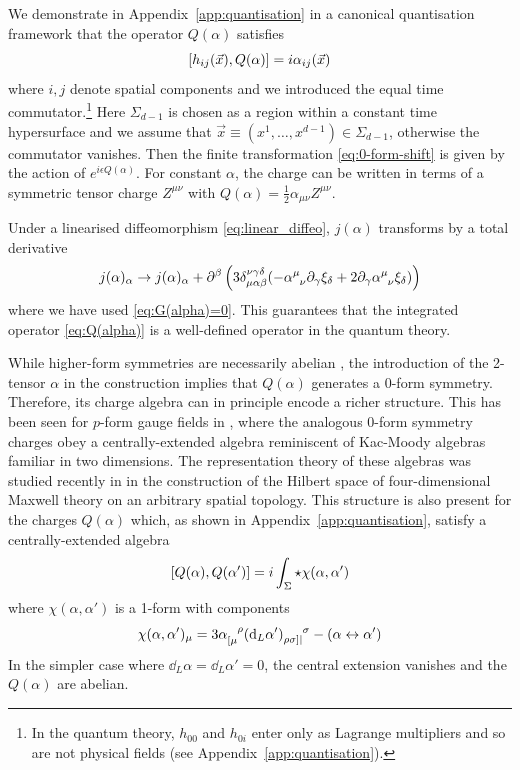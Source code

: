We demonstrate in Appendix~\ref{app:quantisation} in a canonical quantisation framework that the operator $Q(\alpha)$ satisfies
\begin{equation}
    \comm{h_{ij}(\vec{x})}{Q(\alpha)} = i\alpha_{ij}(\vec{x})
\end{equation}
where $i,j$ denote spatial components and we introduced the equal time commutator.\footnote{In the quantum theory, $h_{00}$ and $h_{0i}$ enter only as Lagrange multipliers and so are not physical fields (see Appendix~\ref{app:quantisation}).}
Here $\Sigma_{d-1}$ is chosen as a region within a constant time hypersurface and we assume that $\vec{x} \equiv (x^1,\dots,x^{d-1}) \in \Sigma_{d-1}$, otherwise the commutator vanishes. Then the finite transformation \eqref{eq:0-form-shift} is given by the action of $e^{i\epsilon Q(\alpha)}$. For constant $\alpha$, the charge can be written in terms of a symmetric tensor charge $Z^{\mu\nu}$ with $Q(\alpha)=\frac{1}{2} \alpha_{\mu\nu}Z^{\mu\nu}$.

Under a linearised diffeomorphism \eqref{eq:linear_diffeo}, $j(\alpha)$ transforms by a total derivative
\begin{equation}
    j(\alpha)_\alpha \to j(\alpha)_\alpha + \partial^\beta \left( 3 \delta^{\nu\gamma\delta}_{\mu\alpha\beta} ( -\alpha\indices{^\mu_\nu} \partial_\gamma \xi_\delta + 2 \partial_\gamma \alpha\indices{^\mu_\nu} \xi_\delta) \right)
\end{equation}
where we have used \eqref{eq:G(alpha)=0}.
This guarantees that the integrated operator \eqref{eq:Q(alpha)} is a well-defined operator in the quantum theory.

While higher-form symmetries are necessarily abelian \cite{Gaiotto2015GeneralizedSymmetries}, the introduction of the 2-tensor $\alpha$ in the construction implies that $Q(\alpha)$ generates a 0-form symmetry. Therefore, its charge algebra can in principle encode a richer structure. This has been seen for $p$-form gauge fields in \cite{Hofman:2018lfz}, where the analogous 0-form symmetry charges obey a centrally-extended algebra reminiscent of Kac-Moody algebras familiar in two dimensions. The representation theory of these algebras was studied recently in \cite{Hofman:2024oze} in the construction of the Hilbert space of four-dimensional Maxwell theory on an arbitrary spatial topology. 
This structure is also present for the charges $Q(\alpha)$ which, as shown in Appendix~\ref{app:quantisation}, satisfy a centrally-extended algebra
\begin{equation}\label{eq:central_ext}
    \comm{Q(\alpha)}{Q(\alpha')} = i\int_\Sigma \star \chi(\alpha,\alpha')
\end{equation}
where $\chi(\alpha,\alpha')$ is a 1-form with components
\begin{equation}\label{eq:zeta_def}
    \chi(\alpha,\alpha')_\mu = 3\alpha\indices{_{[\mu}^\rho} (\dd_L\alpha')\indices{_{\rho\sigma]|}^\sigma} - (\alpha\leftrightarrow\alpha')
\end{equation}
In the simpler case where $\dd_L \alpha = \dd_L \alpha' =0$, the central extension vanishes and the $Q(\alpha)$ are abelian.


